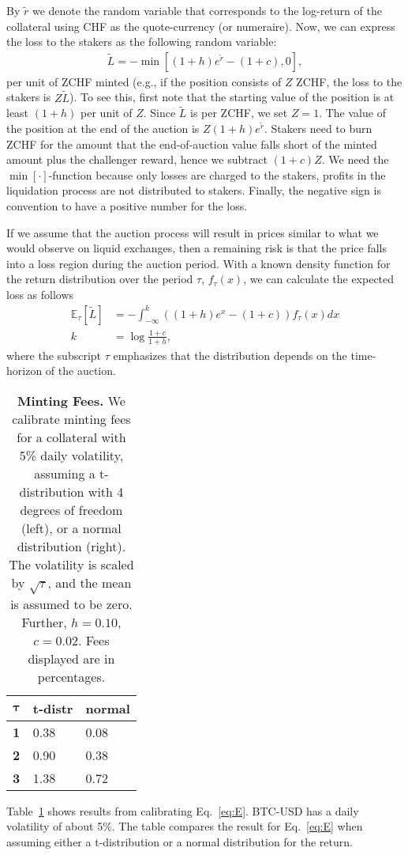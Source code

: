 \documentclass[english,11pt]{article}
\begin{document}
By $\tilde{r}$ we denote the random variable that corresponds to the log-return of the collateral using CHF as the quote-currency (or numeraire).
Now, we can express the loss to the stakers as the following random variable:
\begin{align}
\tilde{L} = -\min\left[(1 + h) e^{\tilde{r}} - (1+c), 0\right],
\end{align}
per unit of ZCHF minted (e.g., if the position consists of $Z$ ZCHF, the loss to the stakers is $Z\tilde{L}$).
To see this, first note that the starting value of the position is at least $(1 + h)$ per unit of $Z$. Since $\tilde{L}$ is per ZCHF, we set $Z=1$.
The value of the position
at the end of the auction is $Z(1 + h) e^{\tilde{r}}$. Stakers need to burn ZCHF for the amount that the end-of-auction value falls short
of the minted amount plus the challenger reward, hence we subtract $(1+c)Z$. We need the $\min[\cdot]$-function because
only losses are charged to the stakers, profits in the liquidation process are not distributed to stakers. Finally, the negative sign is 
convention to have a positive number for the loss.

If we assume that the auction process will result in prices similar to what we would observe on liquid exchanges,
then a remaining risk is that the price falls into a loss region during the auction period.
With a known density function for the return distribution over the period $\tau$, $f_{\tau}(x)$, we can calculate the expected loss as follows
\begin{align}
\mathbb{E}_{\tau}\left[\tilde{L} \right] &= - \int_{-\infty}^k \left((1 + h) e^{x} - (1+c) \right) f_{\tau}(x) dx\label{eq:E}\\
k &= \log \frac{1+c}{1+h},
\end{align}
where the subscript $\tau$ emphasizes that the distribution depends on the time-horizon of the auction.

\begin{table}[]
\caption{\textbf{Minting Fees.}
    We calibrate minting fees for a collateral with 5\% daily volatility,
    assuming a t-distribution with 4 degrees of freedom (left), or a normal
    distribution (right). The volatility is scaled by $\sqrt{\tau}$, and the
    mean is assumed to be zero. Further, $h=0.10$, $c=0.02$. Fees displayed are in percentages.} %
	\begin{center}
	\begin{tabular}{lll}
	\hline
	\textbf{$\mathbf{\tau}$} & \textbf{t-distr} & \textbf{normal} \\
	\hline
	\textbf{1}                   & 0.38             & 0.08            \\
	\textbf{2}                   & 0.90             & 0.38            \\
	\textbf{3}                   & 1.38             & 0.72   \\        
	\hline
	\end{tabular}
	\label{tab:calibration}
	\end{center}
\end{table}

Table~\ref{tab:calibration} shows results
from calibrating Eq.~\eqref{eq:E}. BTC-USD has a daily volatility of about 5\%. 
The table compares the result for Eq.~\eqref{eq:E} when assuming
either a t-distribution or a normal distribution for the return.
\end{document}
